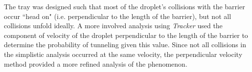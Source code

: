 The tray was designed such that most of the droplet's collisions with the barrier occur ``head on" (i.e. perpendicular to the length of the barrier), but not all collisions unfold ideally. A more involved analysis using \textit{Tracker} used the component of velocity of the droplet perpendicular to the length of the barrier to determine the probability of tunneling given this value. Since not all collisions in the simplistic analysis occurred at the same velocity, the perpendicular velocity method provided a more refined analysis of the phenomenon. 
